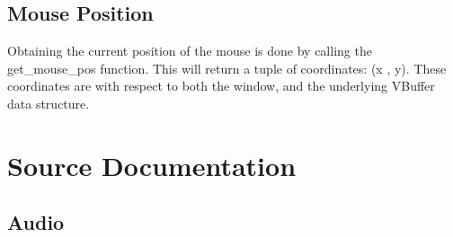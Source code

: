 \documentclass[letterpaper,10pt,english,openany,oneside]{sphinxmanual}
\begin{document}
\section{Mouse Position}
\label{\detokenize{fundamentals:mouse-position}}
\sphinxAtStartPar
Obtaining the current position of the mouse is done by calling the get\_mouse\_pos function. This will return a tuple of coordinates: (x , y). These coordinates are with respect to both the window, and the underlying VBuffer data structure.
\def\sphinxLiteralBlockLabel{\label{\detokenize{fundamentals:id17}}}
\begin{sphinxVerbatim}[commandchars=\\\{\}]
    
       
        
     \PYG{p}{[}\PYG{p}{[}\PYG{p}{]} \PYG{p}{[}\PYG{p}{]}\PYG{p}{]}   
\end{sphinxVerbatim}

\sphinxstepscope


\chapter{Source Documentation}
\label{\detokenize{dpav:source-documentation}}\label{\detokenize{dpav::doc}}

\section{Audio}
\label{\detokenize{dpav:audio}}
\end{document}
